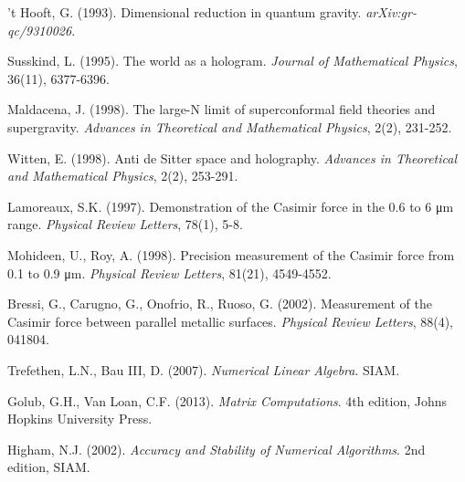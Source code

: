 \documentclass[12pt]{article}
\theoremstyle{plain}
\theoremstyle{definition}
\begin{document}
\begin{thebibliography}{99}
 't Hooft, G. (1993). Dimensional reduction in quantum gravity. \emph{arXiv:gr-qc/9310026}.

 Susskind, L. (1995). The world as a hologram. \emph{Journal of Mathematical Physics}, 36(11), 6377-6396.

 Maldacena, J. (1998). The large-N limit of superconformal field theories and supergravity. \emph{Advances in Theoretical and Mathematical Physics}, 2(2), 231-252.

 Witten, E. (1998). Anti de Sitter space and holography. \emph{Advances in Theoretical and Mathematical Physics}, 2(2), 253-291.

 Lamoreaux, S.K. (1997). Demonstration of the Casimir force in the 0.6 to 6 μm range. \emph{Physical Review Letters}, 78(1), 5-8.

 Mohideen, U., Roy, A. (1998). Precision measurement of the Casimir force from 0.1 to 0.9 μm. \emph{Physical Review Letters}, 81(21), 4549-4552.

 Bressi, G., Carugno, G., Onofrio, R., Ruoso, G. (2002). Measurement of the Casimir force between parallel metallic surfaces. \emph{Physical Review Letters}, 88(4), 041804.

 Trefethen, L.N., Bau III, D. (2007). \emph{Numerical Linear Algebra}. SIAM.

 Golub, G.H., Van Loan, C.F. (2013). \emph{Matrix Computations}. 4th edition, Johns Hopkins University Press.

 Higham, N.J. (2002). \emph{Accuracy and Stability of Numerical Algorithms}. 2nd edition, SIAM.

\end{thebibliography}
\end{document}
